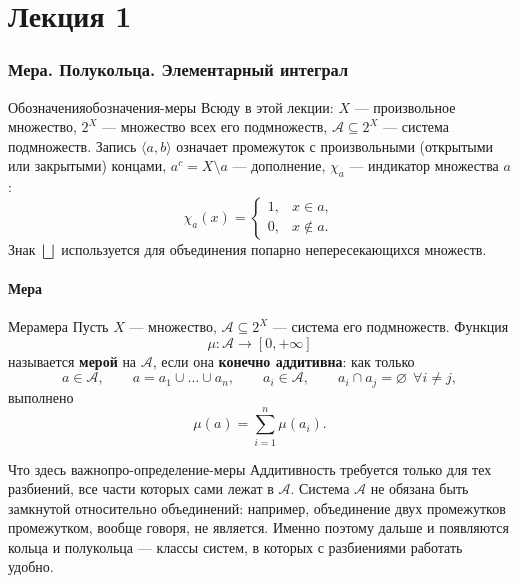 %

\part*{Лекция 1}

\section{Мера. Полукольца. Элементарный интеграл}

\begin{Remark}{Обозначения}{обозначения-меры}
	Всюду в этой лекции: $X$ --- произвольное множество, $2^X$ --- множество
	всех его подмножеств, $\mathcal{A} \subseteq 2^X$ --- система подмножеств.
	Запись $\langle a,b\rangle$ означает промежуток с произвольными
	(открытыми или закрытыми) концами, $a^{c} = X \setminus a$ ---
	дополнение, $\chi_a$ --- индикатор множества $a$:
	\[
	\chi_a(x) =
	\begin{cases}
		1, & x \in a,\\
		0, & x \notin a.
	\end{cases}
	\]
	Знак $\bigsqcup$ используется для объединения попарно непересекающихся
	множеств.
\end{Remark}

\subsection{Мера}

\begin{Definition}{Мера}{мера}
	Пусть $X$ --- множество, $\mathcal{A} \subseteq 2^X$ --- система его
	подмножеств. Функция
	\[
	\mu : \mathcal{A} \to [0, +\infty]
	\]
	называется \textbf{мерой} на $\mathcal{A}$, если она
	\textbf{конечно аддитивна}: как только
	\[
	a \in \mathcal{A}, \qquad
	a = a_1 \cup \ldots \cup a_n, \qquad
	a_i \in \mathcal{A}, \qquad
	a_i \cap a_j = \varnothing \ \ \forall i \neq j,
	\]
	выполнено
	\[
	\mu(a) = \sum_{i=1}^{n} \mu(a_i).
	\]
\end{Definition}

\begin{Remark}{Что здесь важно}{про-определение-меры}
	Аддитивность требуется только для тех разбиений, все части которых сами
	лежат в $\mathcal{A}$. Система $\mathcal{A}$ не обязана быть замкнутой
	относительно объединений: например, объединение двух промежутков
	промежутком, вообще говоря, не является. Именно поэтому дальше и
	появляются кольца и полукольца --- классы систем, в которых с разбиениями
	работать удобно.
\end{Remark}

